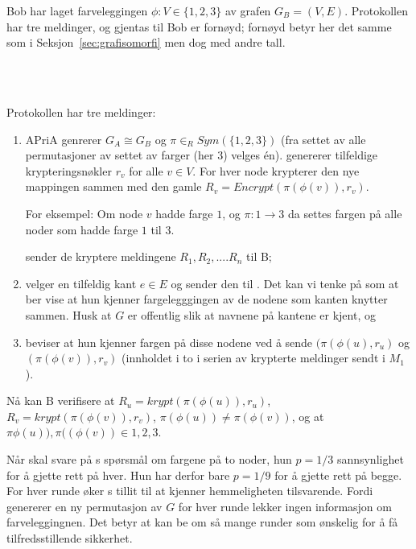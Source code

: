 \documentclass[a4paper, parskip=half]{scrartcl}
\theoremstyle{definition}
\begin{document}
Bob har laget farveleggingen $\phi: V \in \{1,2,3\}$ av grafen
$G_B=(V,E)$.  Protokollen har tre meldinger, og gjentas til Bob er
fornøyd; fornøyd betyr her det samme som i
Seksjon~\ref{sec:grafisomorfi} men dog med andre tall.

\begin{ASteps}
  \\
   \\
\end{ASteps}


Protokollen har tre meldinger:
%
\begin{enumerate}
\item [$M_1$] APri{A} genrerer $G_A \cong G_B$ og $\pi \in_R Sym(\{1,2,3\})$
  (fra settet av alle permutasjoner av settet av farger (her 3) velges
  én).   genererer tilfeldige krypteringsnøkler
  $r_v$ for alle $v \in V$.  For hver node krypterer  den nye
  mappingen sammen med 
  den gamle $R_v = \textit{Encrypt}(\pi(\phi(v)), r_v)$.

  For eksempel: Om node $v$ hadde farge $1$, og $\pi: 1\to3$ da settes
  fargen på alle noder som hadde farge $1$ til $3$.
  
   sender de kryptere meldingene $R_1, R_2, .... R_n$ til B;

\item [$M_2$]  velger en tilfeldig kant $e \in E$ og sender
  den til .  Det 
  kan vi tenke på som at  ber  vise at hun kjenner
  fargelegggingen av de nodene som kanten knytter sammen.  Husk at $G$
  er offentlig slik at navnene på kantene er kjent, og

\item {} beviser at hun kjenner fargen på disse nodene ved å
  sende $(\pi(\phi(u), r_u)$ og
  $(\pi(\phi(v)), r_v)$ (innholdet i to i serien av krypterte
  meldinger sendt i $M_1$).
\end{enumerate}

Nå kan B verifisere at
$R_u = krypt(\pi(\phi(u)), r_u)$,
$R_v = krypt(\pi(\phi(v)), r_v)$,
$\pi(\phi(u)) \not= \pi(\phi(v))$, og at
$\pi\phi(u)), \pi((\phi(v)) \in {1,2,3}$.

Når  skal svare på s spørsmål om fargene på to noder,
hun $p=1/3$ sannsynlighet for å gjette rett på hver.  Hun har derfor
bare $p=1/9$ for å gjette rett på begge.  For hver runde øker
s tillit til at  kjenner hemmeligheten tilsvarende.
Fordi  genererer en ny permutasjon av $G$ for hver runde
lekker ingen informasjon om farveleggingnen.  Det betyr at 
 kan be om så mange runder som ønskelig for å få
tilfredsstillende sikkerhet.
\end{document}
